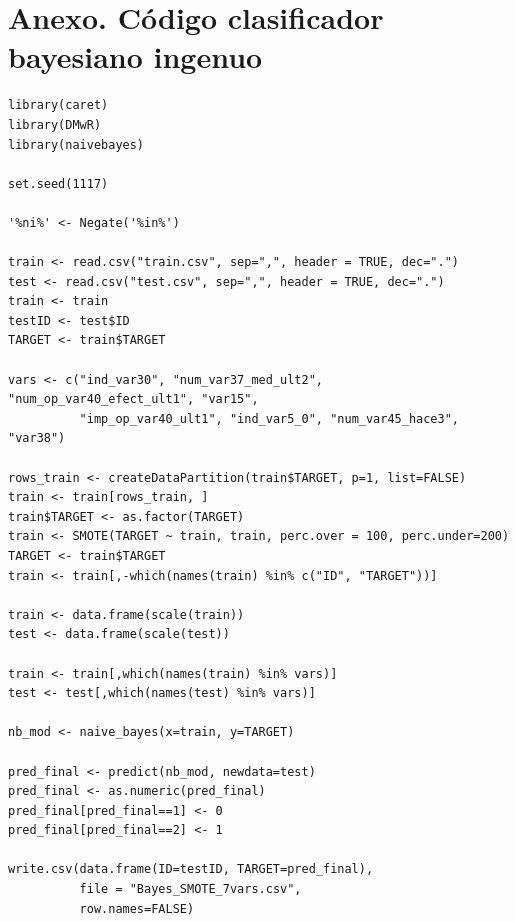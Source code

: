 \documentclass[11pt,a4paper,spanish]{article} %
\begin{document}
\section{Anexo. Código clasificador bayesiano ingenuo}
{\scriptsize
\begin{verbatim}
library(caret)
library(DMwR)
library(naivebayes)

set.seed(1117)

'%ni%' <- Negate('%in%') 

train <- read.csv("train.csv", sep=",", header = TRUE, dec=".")
test <- read.csv("test.csv", sep=",", header = TRUE, dec=".")
train <- train
testID <- test$ID
TARGET <- train$TARGET

vars <- c("ind_var30", "num_var37_med_ult2", "num_op_var40_efect_ult1", "var15", 
          "imp_op_var40_ult1", "ind_var5_0", "num_var45_hace3", "var38")

rows_train <- createDataPartition(train$TARGET, p=1, list=FALSE)
train <- train[rows_train, ]
train$TARGET <- as.factor(TARGET)
train <- SMOTE(TARGET ~ train, train, perc.over = 100, perc.under=200)
TARGET <- train$TARGET
train <- train[,-which(names(train) %in% c("ID", "TARGET"))]

train <- data.frame(scale(train))
test <- data.frame(scale(test))

train <- train[,which(names(train) %in% vars)]
test <- test[,which(names(test) %in% vars)]

nb_mod <- naive_bayes(x=train, y=TARGET)

pred_final <- predict(nb_mod, newdata=test)
pred_final <- as.numeric(pred_final)
pred_final[pred_final==1] <- 0
pred_final[pred_final==2] <- 1

write.csv(data.frame(ID=testID, TARGET=pred_final), 
          file = "Bayes_SMOTE_7vars.csv",
          row.names=FALSE)

\end{verbatim}
}

\newpage
\end{document}
